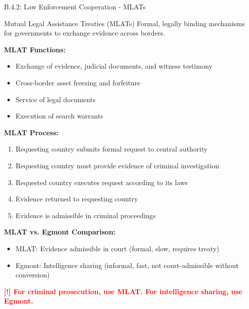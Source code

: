 \documentclass[11pt,a4paper]{beamer}
\newcommand{\redflag}[1]{\textcolor{red}{\textbf{[!] #1}}}
\begin{document}
	\begin{frame}{B.4.2: Law Enforcement Cooperation - MLATs}
		\begin{block}{Mutual Legal Assistance Treaties (MLATs)}
			Formal, legally binding mechanisms for governments to exchange evidence across borders.
		\end{block}
		\textbf{MLAT Functions:}
		\begin{itemize}
			\item Exchange of evidence, judicial documents, and witness testimony
			\item Cross-border asset freezing and forfeiture
			\item Service of legal documents
			\item Execution of search warrants
		\end{itemize}
		\textbf{MLAT Process:}
		\begin{enumerate}
			\item Requesting country submits formal request to central authority
			\item Requesting country must provide evidence of criminal investigation
			\item Requested country executes request according to its laws
			\item Evidence returned to requesting country
			\item Evidence is admissible in criminal proceedings
		\end{enumerate}
		\textbf{MLAT vs. Egmont Comparison:}
		\begin{itemize}
			\item MLAT: Evidence admissible in court (formal, slow, requires treaty)
			\item Egmont: Intelligence sharing (informal, fast, not court-admissible without conversion)
		\end{itemize}
		\redflag{For criminal prosecution, use MLAT. For intelligence sharing, use Egmont.}
	\end{frame}
	
\end{document}
